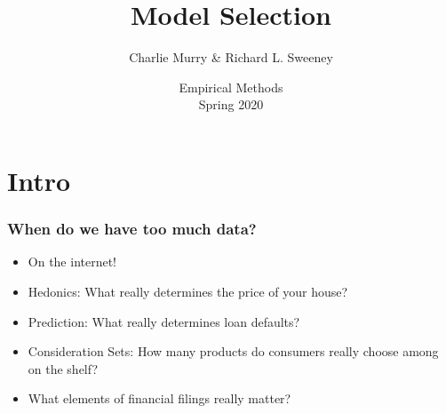 

\title{Model Selection}
\author{Charlie Murry \& Richard L. Sweeney}
\date{Empirical Methods \\ Spring 2020}




\begin{frame}
    \titlepage
\end{frame}

\begin{frame}
    \tableofcontents  
\end{frame}
    
   
\section{Intro}


\begin{frame}
\frametitle{When do we have too much data?}
\begin{itemize}
\item On the internet!
\item Hedonics: What really determines the price of your house?
\item Prediction: What really determines loan defaults?
\item Consideration Sets: How many products do consumers really choose among on the shelf?
\item What elements of financial filings really matter?
\end{itemize}

\end{frame}


